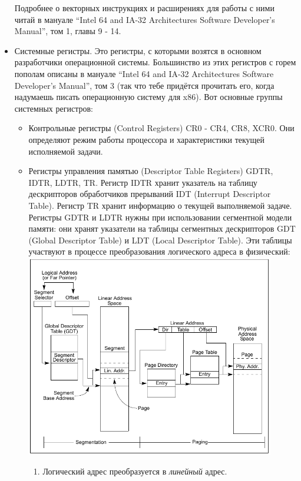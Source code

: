 \documentclass[11pt]{book}
\begin{document}
\begin{itemize}
Подробнее о векторных инструкциях и расширениях для работы с ними читай в мануале ``Intel 64 and IA-32 Architectures Software Developer's Manual'', том 1, главы 9 - 14.
\item Системные регистры.
Это регистры, с которыми возятся в основном разработчики операционной системы.
Большинство из этих регистров с горем пополам описаны в мануале ``Intel 64 and IA-32 Architectures Software Developer's Manual'', том 3
(так что тебе придётся прочитать его, когда надумаешь писать операционную систему для x86).
Вот основные группы системных регистров:
    \begin{itemize}
    \item Контрольные регистры (Control Registers) CR0 - CR4, CR8, XCR0.
    Они определяют режим работы процессора и характеристики текущей исполняемой задачи.
    \item Регистры управления памятью (Descriptor Table Registers) GDTR, IDTR, LDTR, TR.
    Регистр IDTR хранит указатель на таблицу дескрипторов обработчиков прерываний IDT (Interrupt Descriptor Table).
    Регистр TR хранит информацию о текущей выполняемой задаче.
    Регистры GDTR и LDTR нужны при использовании сегментной модели памяти:
    они хранят указатели на таблицы сегментных дескрипторов GDT (Global Descriptor Table) и LDT (Local Descriptor Table).
    Эти таблицы участвуют в процессе преобразования логического адреса в физический:
    \\
    \includegraphics[height=3.5in]{pic/memory_management.png}
    \\
        \begin{enumerate}
        \item Логический адрес преобразуется в \emph{линейный} адрес.

\end{enumerate}
\end{itemize}
\end{itemize}
\end{document}
